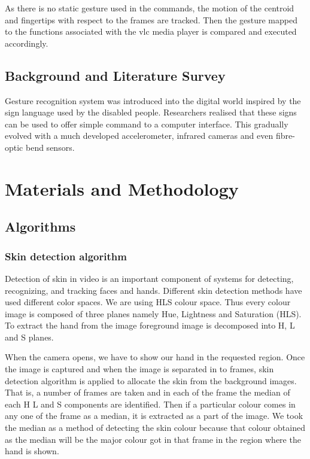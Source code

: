 \documentclass[a4paper,11pt]{article}
\begin{document}
			 As there is no static gesture used in the commands, the motion of the centroid and fingertips with respect to the frames are tracked. Then the gesture mapped to the functions associated with the vlc media player is compared and executed accordingly.


		\subsection{Background and Literature Survey}
			Gesture recognition system was introduced into the digital world inspired by the sign language used by the disabled people. Researchers realised that these signs can be used to offer simple command to a computer interface. This gradually evolved with a much developed accelerometer, infrared cameras and even fibre-optic bend sensors.




	\section{Materials and Methodology}
		\subsection{Algorithms}
			\subsubsection{Skin detection algorithm}	
				Detection of skin in video is an important component of systems for detecting, recognizing, and tracking faces and hands. Different skin detection methods have used different color spaces. We are using HLS colour space. Thus every colour image is composed of three planes namely Hue, Lightness and Saturation (HLS). To extract the hand from the image foreground image is decomposed into H, L and S planes.
				
				When the camera opens, we have to show our hand in the requested region.  Once the image is captured and when the image is separated in to frames, skin detection algorithm is applied to allocate the skin from the background images. That is, a number of frames are taken and in each of the frame the median of each H L and S components are identified. Then if a particular colour comes in any one of the frame as a median, it is extracted as a part of the image. We took the median as a method of detecting the skin colour because that colour obtained as the median will be the major colour got in that frame in the region where the hand is shown. 
\end{document}
